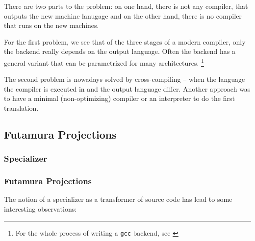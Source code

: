 There are two parts to the problem: on one hand, there is not any compiler, 
that outputs the new machine lanugage and on the other hand, there is no 
compiler that runs on the new machines.

For the first problem, we see that of the three stages of a modern compiler,
only the backend really depends on the output language. Often the backend has 
a general variant that can be parametrized for many architectures.
\footnote{For the whole process of writing a {\tt gcc} backend, see \cite{nilsson2000porting}}

The second problem is nowadays solved by cross-compiling -- when the language 
the compiler is executed in and the output language differ. Another approach 
was to have a minimal (non-optimizing) compiler or an interpreter to do the 
first translation.



\subsection{Futamura Projections} %
\label{sub:Futamura}
\subsubsection{Specializer} %
\label{ssub:Specializer}
\subsubsection{Futamura Projections} %
\label{ssub:Futamura Projections}
The notion of a specializer as a transformer of source code has lead to some 
interesting observations: 

